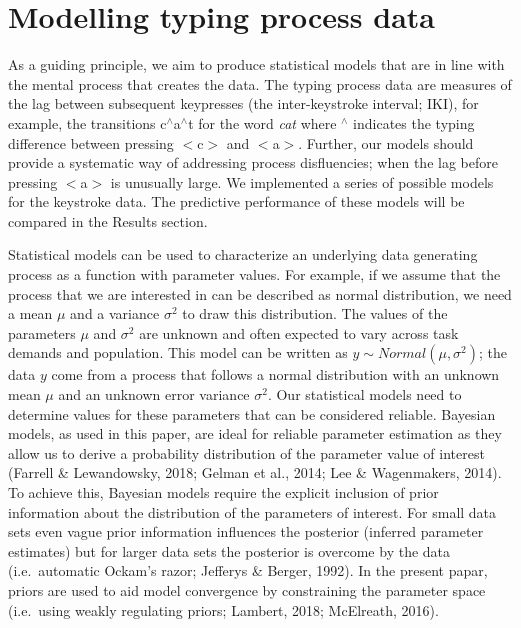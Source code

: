 \documentclass[english,man,floatsintext]{apa7}
\begin{document}
\hypertarget{modelling-typing-process-data}{%
\section{Modelling typing process data}\label{modelling-typing-process-data}}

As a guiding principle, we aim to produce statistical models that are in line with the mental process that creates the data. The typing process data are measures of the lag between subsequent keypresses (the inter-keystroke interval; IKI), for example, the transitions c\(^{\wedge}\)a\(^{\wedge}\)t for the word \emph{cat} where \(^{\wedge}\) indicates the typing difference between pressing \(<\)c\(>\) and \(<\)a\(>\). Further, our models should provide a systematic way of addressing process disfluencies; when the lag before pressing \(<\)a\(>\) is unusually large. We implemented a series of possible models for the keystroke data. The predictive performance of these models will be compared in the Results section.

Statistical models can be used to characterize an underlying data generating process as a function with parameter values. For example, if we assume that the process that we are interested in can be described as normal distribution, we need a mean \(\mu\) and a variance \(\sigma^2\) to draw this distribution. The values of the parameters \(\mu\) and \(\sigma^2\) are unknown and often expected to vary across task demands and population. This model can be written as \(y \sim Normal(\mu, \sigma^2)\); the data \(y\) come from a process that follows a normal distribution with an unknown mean \(\mu\) and an unknown error variance \(\sigma^2\). Our statistical models need to determine values for these parameters that can be considered reliable. Bayesian models, as used in this paper, are ideal for reliable parameter estimation as they allow us to derive a probability distribution of the parameter value of interest (Farrell \& Lewandowsky, 2018; Gelman et al., 2014; Lee \& Wagenmakers, 2014). To achieve this, Bayesian models require the explicit inclusion of prior information about the distribution of the parameters of interest. For small data sets even vague prior information influences the posterior (inferred parameter estimates) but for larger data sets the posterior is overcome by the data (i.e.~automatic Ockam's razor; Jefferys \& Berger, 1992). In the present papar, priors are used to aid model convergence by constraining the parameter space (i.e.~using weakly regulating priors; Lambert, 2018; McElreath, 2016).
\end{document}
